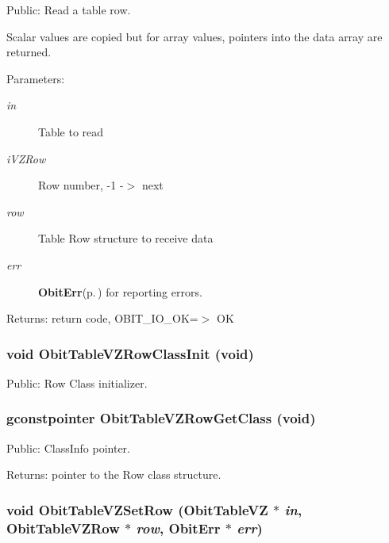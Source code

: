 Public: Read a table row. 

Scalar values are copied but for array values, pointers into the data array are returned. \begin{Desc}
\item[Parameters:]
\begin{description}
\item[{\em in}]Table to read \item[{\em i\-VZRow}]Row number, -1 -$>$ next \item[{\em row}]Table Row structure to receive data \item[{\em err}]{\bf Obit\-Err}{\rm (p.\,\pageref{structObitErr})} for reporting errors. \end{description}
\end{Desc}
\begin{Desc}
\item[Returns:]return code, OBIT\_\-IO\_\-OK=$>$ OK \end{Desc}
\subsubsection{\setlength{\rightskip}{0pt plus 5cm}void Obit\-Table\-VZRow\-Class\-Init (void)}\label{ObitTableVZ_8h_a7}


Public: Row Class initializer. 

\subsubsection{\setlength{\rightskip}{0pt plus 5cm}gconstpointer Obit\-Table\-VZRow\-Get\-Class (void)}\label{ObitTableVZ_8h_a9}


Public: Class\-Info pointer. 

\begin{Desc}
\item[Returns:]pointer to the Row class structure. \end{Desc}
\subsubsection{\setlength{\rightskip}{0pt plus 5cm}void Obit\-Table\-VZSet\-Row ({\bf Obit\-Table\-VZ} $\ast$ {\em in}, {\bf Obit\-Table\-VZRow} $\ast$ {\em row}, {\bf Obit\-Err} $\ast$ {\em err})}\label{ObitTableVZ_8h_a19}


